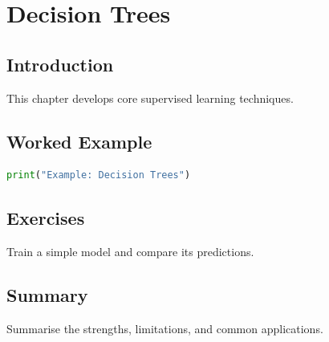 \chapter{Decision Trees}
\label{chap:vol6-8}



\section{Introduction}
This chapter develops core supervised learning techniques.

\section{Worked Example}
\begin{lstlisting}[language=Python]
print("Example: Decision Trees")
\end{lstlisting}

\section{Exercises}
\begin{exercise}
Train a simple model and compare its predictions.
\end{exercise}

\section{Summary}
Summarise the strengths, limitations, and common applications.
